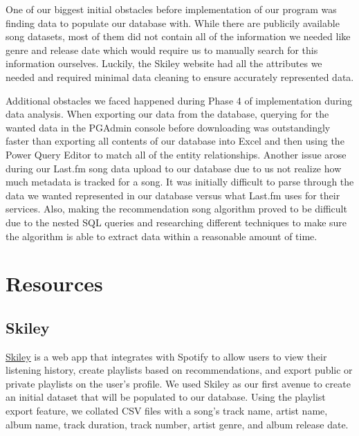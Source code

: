 \documentclass[12pt]{article}
\begin{document}
    \vspace{0.5cm}

    \noindent One of our biggest initial obstacles before implementation of our program was finding
    data to populate our database with. While there are publicily available song datasets,
    most of them did not contain all of the information we needed like genre and release date
    which would require us to manually search for this information ourselves. Luckily, the
    Skiley website had all the attributes we needed and required minimal data cleaning to
    ensure accurately represented data.

    \vspace{0.5cm}

    \noindent Additional obstacles we faced happened during Phase 4 of implementation during data analysis.
    When exporting our
    data from the database, querying for the wanted data in the PGAdmin console before downloading was
    outstandingly faster than exporting all contents of our database into Excel and then
    using the Power Query Editor to match all of the entity relationships. Another issue
    arose during our Last.fm song data upload to our database due to us not realize how much
    metadata is tracked for a song. It was initially
    difficult to parse through the data we wanted represented in our database versus what Last.fm
    uses for their services. Also, making the recommendation song algorithm proved to be
    difficult due to the nested SQL queries and researching different techniques to make sure
    the algorithm is able to extract data within a reasonable amount of time.

    \section{Resources}

    \subsection{Skiley}
    \underline{\href{https://skiley.net/}{Skiley}} is a web app that integrates with Spotify to allow users to view their listening history,
    create playlists based on recommendations, and export public or private playlists on the user's profile.
    We used Skiley as our first avenue to create an initial dataset that will be populated to our database.
    Using the playlist export feature, we collated CSV files with a song's track name, artist name, album name,
    track duration, track number, artist genre, and album release date.
\end{document}
